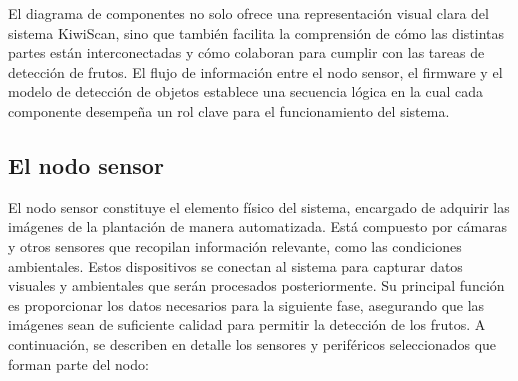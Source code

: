 \vspace{1cm}

El diagrama de componentes no solo ofrece una representación visual clara del sistema KiwiScan, sino que también facilita la comprensión de cómo las distintas partes están interconectadas y cómo colaboran para cumplir con las tareas de detección de frutos. El flujo de información entre el nodo sensor, el firmware y el modelo de detección de objetos establece una secuencia lógica en la cual cada componente desempeña un rol clave para el funcionamiento del sistema.

\subsection{El nodo sensor}

El nodo sensor constituye el elemento físico del sistema, encargado de adquirir las imágenes de la plantación de manera automatizada. Está compuesto por cámaras y otros sensores que recopilan información relevante, como las condiciones ambientales. Estos dispositivos se conectan al sistema para capturar datos visuales y ambientales que serán procesados posteriormente. Su principal función es proporcionar los datos necesarios para la siguiente fase, asegurando que las imágenes sean de suficiente calidad para permitir la detección de los frutos. A continuación, se describen en detalle los sensores y periféricos seleccionados que forman parte del nodo:

\newpage

